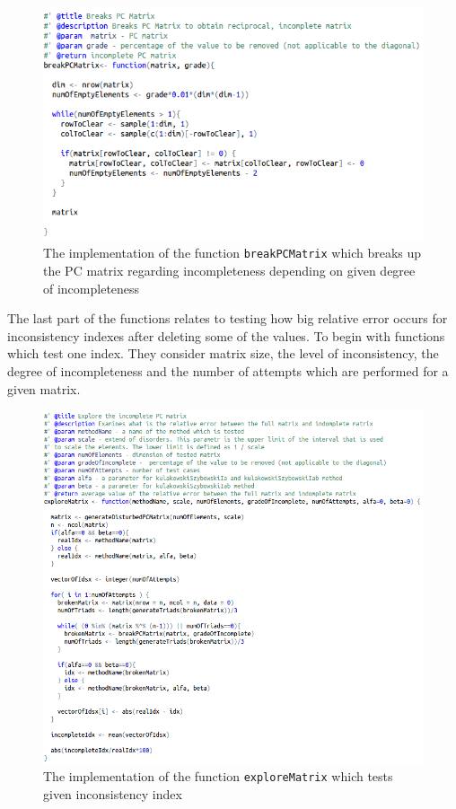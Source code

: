 \begin{figure}[h]
\centerline{\includegraphics[scale=0.73]{images/kod13.png}}
\caption{The implementation of the function \texttt{breakPCMatrix} which breaks up the PC matrix regarding incompleteness depending on given degree of incompleteness}
\label{fig:rstudio}
\end{figure}

The last part of the functions relates to testing how big relative error occurs for inconsistency indexes after deleting some of the values. To begin with functions which test one index. They consider matrix size, the level of inconsistency, the degree of incompleteness and the number of attempts which are performed for a given matrix.

\begin{figure}[h]
\centerline{\includegraphics[scale=0.58]{images/kod21.png}}
\caption{The implementation of the function \texttt{exploreMatrix} which tests given inconsistency index}
\label{fig:rstudio}
\end{figure}

